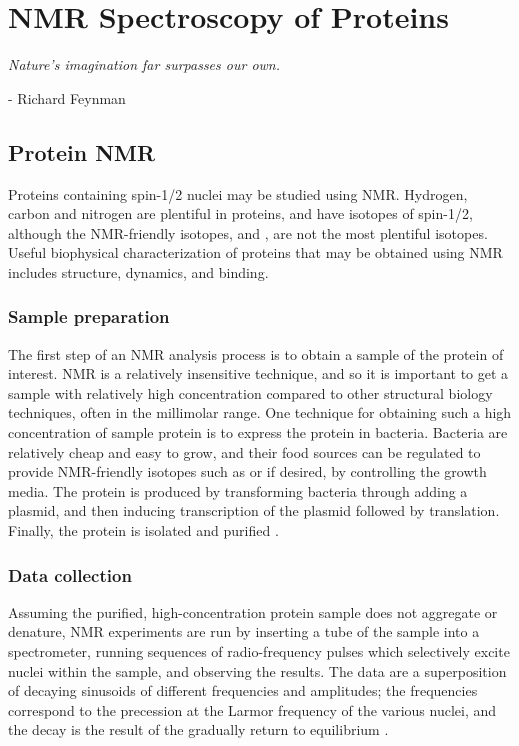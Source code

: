 \chapter{NMR Spectroscopy of Proteins}
\begin{center}
  \textit{Nature's imagination far surpasses our own.}

 - Richard Feynman
\end{center}



\section{Protein NMR}

Proteins containing spin-1/2 nuclei may be studied using NMR.  Hydrogen, 
carbon and nitrogen are plentiful in proteins, and have isotopes of 
spin-1/2, although the NMR-friendly isotopes, \nmrisoc{} and \nmrison{}, 
are not the most plentiful isotopes.
Useful biophysical characterization of proteins that may be 
obtained using NMR includes structure, dynamics, and binding.

\subsection*{Sample preparation}

The first step of an NMR analysis process is to obtain a sample of the protein
of interest.  NMR is a relatively insensitive technique, and so it is important
to get a sample with relatively high concentration compared to other structural
biology techniques, often in the millimolar range.  
One technique for obtaining such a high concentration of sample protein is
to express the protein in bacteria.  Bacteria are relatively cheap and easy
to grow, and their food sources can be regulated to provide NMR-friendly 
isotopes such as \nmrisoc{} or \nmrison{} if desired, by controlling the growth media.
The protein is produced by transforming bacteria through adding a plasmid,
and then inducing transcription of the plasmid followed by translation.  
Finally, the protein is isolated and purified \cite{derome1987modern}.

\subsection*{Data collection}

Assuming the purified, high-concentration protein sample does not aggregate
or denature, NMR experiments are run by inserting a tube of the sample into 
a spectrometer, running sequences of radio-frequency pulses which selectively
excite nuclei within the sample, and observing the results.  The data are a 
superposition of decaying sinusoids of different frequencies and amplitudes;
the frequencies correspond to the precession at the Larmor frequency
of the various nuclei, and the decay is the result
of the gradually return to equilibrium \cite{bloch1946nuclear}.

